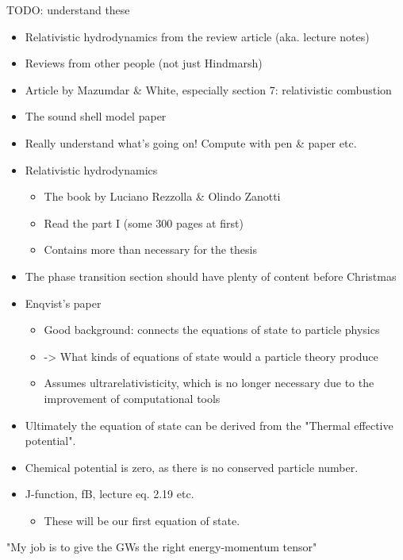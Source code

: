 TODO: understand these
\begin{itemize}
    \item Relativistic hydrodynamics from the review article (aka. lecture notes) \cite{lecture_notes}
    \item Reviews from other people (not just Hindmarsh)
    \item Article by Mazumdar \& White, especially section 7: relativistic combustion \cite{mazumdar_review_2019}
    \item The sound shell model paper
    \item Really understand what's going on! Compute with pen \& paper etc.
    \item Relativistic hydrodynamics
    \begin{itemize}
        \item The book by Luciano Rezzolla \& Olindo Zanotti \cite{rezzolla_relativistic_2013}
        \item Read the part I (some 300 pages at first)
        \item Contains more than necessary for the thesis
    \end{itemize}
    \item The phase transition section should have plenty of content before Christmas
    \item Enqvist's paper
    \begin{itemize}
        \item Good background: connects the equations of state to particle physics
        \item -> What kinds of equations of state would a particle theory produce
        \item Assumes ultrarelativisticity, which is no longer necessary due to the improvement of computational tools
    \end{itemize}
    \item Ultimately the equation of state can be derived from the "Thermal effective potential".
    \item Chemical potential is zero, as there is no conserved particle number.
    \item J-function, fB, lecture eq. 2.19 etc.
    \begin{itemize}
        \item These will be our first equation of state.
    \end{itemize}
\end{itemize}

"My job is to give the GWs the right energy-momentum tensor"

